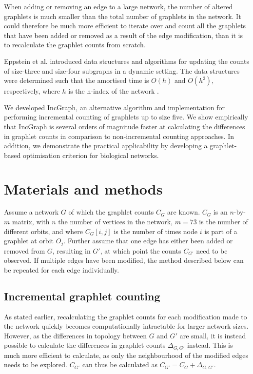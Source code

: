When adding or removing an edge to a large network, the number of altered graphlets is much smaller than the total number of graphlets in the network. It could therefore be much more efficient to iterate over and count all the graphlets that have been added or removed as a result of the edge modification, than it is to recalculate the graphlet counts from scratch. 

Eppstein et al. introduced data structures and algorithms for updating the counts of size-three \cite{eppstein_hindexgraphits_2009} and size-four \cite{eppstein_extendeddynamicsubgraph_2012} subgraphs in a dynamic setting. The data structures were determined such that the amortised time is $O(h)$ and $O(h^2)$, respectively, where $h$ is the h-index of the network \cite{hirsch_indexquantifyindividual_2005}.

We developed IncGraph, an alternative algorithm and implementation for performing incremental counting of graphlets up to size five. We show empirically that IncGraph is several orders of magnitude faster at calculating the differences in graphlet counts in comparison to non-incremental counting approaches. In addition, we demonstrate the practical applicability by developing a graphlet-based optimisation criterion for biological networks.


\section*{Materials and methods}
Assume a network $G$ of which the graphlet counts $C_G$ are known. $C_G$ is an $n$-by-$m$ matrix, with $n$ the number of vertices in the network, $m = 73$ is the number of different orbits, and where $C_G[i,j]$ is the number of times node $i$ is part of a graphlet at orbit $O_j$. 
Further assume that one edge has either been added or removed from $G$, resulting in $G'$, at which point the counts $C_{G'}$ need to be observed. If multiple edges have been modified, the method described below can be repeated for each edge individually.

\subsection*{Incremental graphlet counting}
As stated earlier, recalculating the graphlet counts for each modification made to the network quickly becomes computationally intractable for larger network sizes. However, as the differences in topology between $G$ and $G'$ are small, it is instead possible to calculate the differences in graphlet counts $\Delta_{G, G'}$ instead. This is much more efficient to calculate, as only the neighbourhood of the modified edges needs to be explored. $C_{G'}$ can thus be calculated as $C_{G'} = C_G + \Delta_{G,G'}$.


